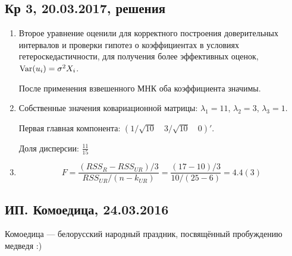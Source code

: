 \documentclass[12pt, a4paper]{article}
\theoremstyle{definition}
\begin{document}
\subsection{Кр 3, 20.03.2017, решения}
\begin{enumerate}
  \item Второе уравнение оценили для корректного построения доверительных интервалов и проверки гипотез о коэффициентах в условиях гетероскедастичности, для получения более эффективных оценок, $\operatorname{Var}(u_i)=\sigma^2 X_i$.

  После применения взвешенного МНК оба коэффициента значимы.
  \item

Собственные значения ковариационной матрицы: $\lambda_1 = 11$, $\lambda_2 = 3$, $\lambda_3 = 1$.

Первая главная компонента: $(1/\sqrt{10} \quad 3/\sqrt{10} \quad 0)'$.

Доля дисперсии: $\frac{11}{15}$

  \item
  \[
  F = \frac{(RSS_R - RSS_{UR})/3}{RSS_{UR}/(n-k_{UR})}= \frac{(17-10)/3}{10/(25-6)} = 4.4(3)
  \]

\end{enumerate}



\subsection{ИП. Комоедица, 24.03.2016}


Комоедица — белорусский народный праздник, посвящённый пробуждению медведя :)
\end{document}
